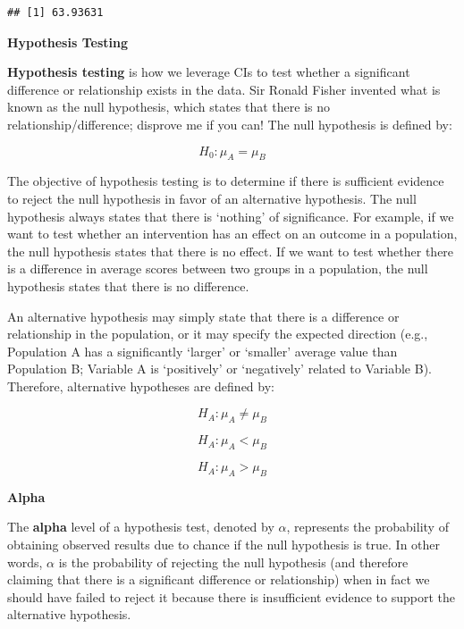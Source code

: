 \documentclass[]{book}
\newenvironment{Shaded}{\begin{snugshade}}{\end{snugshade}}
\newcommand{\CommentTok}[1]{\textcolor[rgb]{0.56,0.35,0.01}{\textit{#1}}}
\newcommand{\NormalTok}[1]{#1}
\begin{document}
\begin{Shaded}
\end{Shaded}

\begin{verbatim}
## [1] 63.93631
\end{verbatim}

\textbf{Hypothesis Testing}

\textbf{Hypothesis testing} is how we leverage CIs to test whether a significant difference or relationship exists in the data. Sir Ronald Fisher invented what is known as the null hypothesis, which states that there is no relationship/difference; disprove me if you can! The null hypothesis is defined by:

\[ H_0: \mu_A = \mu_B \]

The objective of hypothesis testing is to determine if there is sufficient evidence to reject the null hypothesis in favor of an alternative hypothesis. The null hypothesis always states that there is `nothing' of significance. For example, if we want to test whether an intervention has an effect on an outcome in a population, the null hypothesis states that there is no effect. If we want to test whether there is a difference in average scores between two groups in a population, the null hypothesis states that there is no difference.

An alternative hypothesis may simply state that there is a difference or relationship in the population, or it may specify the expected direction (e.g., Population A has a significantly `larger' or `smaller' average value than Population B; Variable A is `positively' or `negatively' related to Variable B). Therefore, alternative hypotheses are defined by:

\[ H_A: \mu_A \neq \mu_B \]

\[ H_A: \mu_A < \mu_B \]

\[ H_A: \mu_A > \mu_B \]

\textbf{Alpha}

The \textbf{alpha} level of a hypothesis test, denoted by \(\alpha\), represents the probability of obtaining observed results due to chance if the null hypothesis is true. In other words, \(\alpha\) is the probability of rejecting the null hypothesis (and therefore claiming that there is a significant difference or relationship) when in fact we should have failed to reject it because there is insufficient evidence to support the alternative hypothesis.
\end{document}

